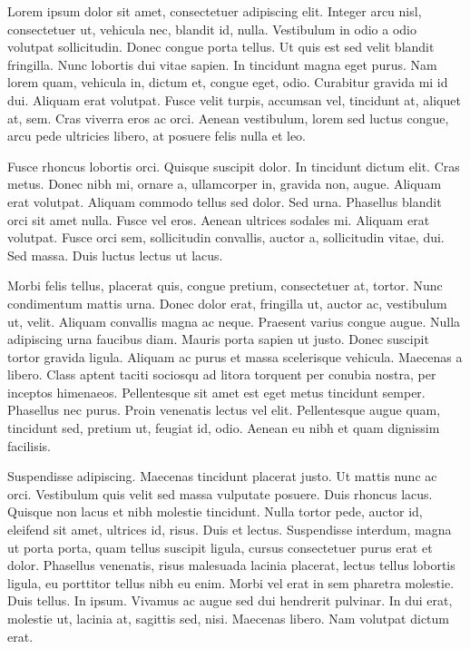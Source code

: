 
Lorem ipsum dolor sit amet, consectetuer adipiscing elit. Integer arcu nisl,
consectetuer ut, vehicula nec, blandit id, nulla. Vestibulum in odio a odio
volutpat sollicitudin. Donec congue porta tellus. Ut quis est sed velit
blandit fringilla. Nunc lobortis dui vitae sapien. In tincidunt magna eget
purus. Nam lorem quam, vehicula in, dictum et, congue eget, odio. Curabitur
gravida mi id dui. Aliquam erat volutpat. Fusce velit turpis, accumsan vel,
tincidunt at, aliquet at, sem. Cras viverra eros ac orci. Aenean vestibulum,
lorem sed luctus congue, arcu pede ultricies libero, at posuere felis nulla
et leo.

Fusce rhoncus lobortis orci. Quisque suscipit dolor. In tincidunt dictum
elit. Cras metus. Donec nibh mi, ornare a, ullamcorper in, gravida non,
augue. Aliquam erat volutpat. Aliquam commodo tellus sed dolor. Sed urna.
Phasellus blandit orci sit amet nulla. Fusce vel eros. Aenean ultrices
sodales mi. Aliquam erat volutpat. Fusce orci sem, sollicitudin convallis,
auctor a, sollicitudin vitae, dui. Sed massa. Duis luctus lectus ut lacus.

Morbi felis tellus, placerat quis, congue pretium, consectetuer at, tortor.
Nunc condimentum mattis urna. Donec dolor erat, fringilla ut, auctor ac,
vestibulum ut, velit. Aliquam convallis magna ac neque. Praesent varius
congue augue. Nulla adipiscing urna faucibus diam. Mauris porta sapien ut
justo. Donec suscipit tortor gravida ligula. Aliquam ac purus et massa
scelerisque vehicula. Maecenas a libero. Class aptent taciti sociosqu ad
litora torquent per conubia nostra, per inceptos himenaeos. Pellentesque
sit amet est eget metus tincidunt semper. Phasellus nec purus. Proin
venenatis lectus vel elit. Pellentesque augue quam, tincidunt sed, pretium
ut, feugiat id, odio. Aenean eu nibh et quam dignissim facilisis.

Suspendisse adipiscing. Maecenas tincidunt placerat justo. Ut mattis nunc ac
orci. Vestibulum quis velit sed massa vulputate posuere. Duis rhoncus lacus.
Quisque non lacus et nibh molestie tincidunt. Nulla tortor pede, auctor id,
eleifend sit amet, ultrices id, risus. Duis et lectus. Suspendisse interdum,
magna ut porta porta, quam tellus suscipit ligula, cursus consectetuer purus
erat et dolor. Phasellus venenatis, risus malesuada lacinia placerat, lectus
tellus lobortis ligula, eu porttitor tellus nibh eu enim. Morbi vel erat in
sem pharetra molestie. Duis tellus. In ipsum. Vivamus ac augue sed dui
hendrerit pulvinar. In dui erat, molestie ut, lacinia at, sagittis sed, nisi.
Maecenas libero. Nam volutpat dictum erat.

